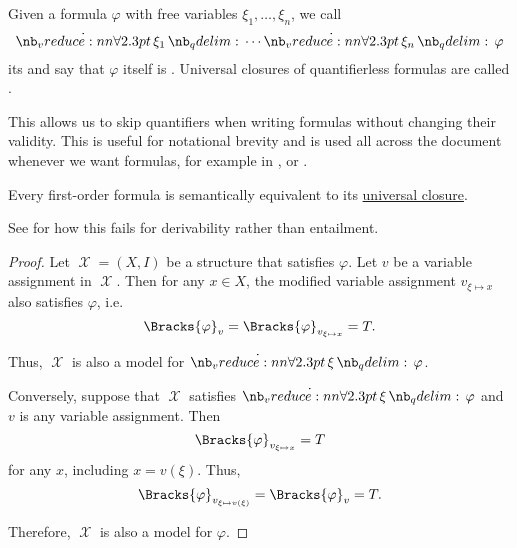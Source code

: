 \begin{definition}\label{def:universal_closure}
  Given a formula \( \varphi \) with free variables \( \xi_1, \ldots, \xi_n \), we call
  \begin{equation*}
    \qforall {\xi_1} \cdots \qforall {\xi_n} \varphi
  \end{equation*}
  its  and say that \( \varphi \) itself is . Universal closures of quantifierless formulas are called .
\end{definition}
\begin{comments}
  \item This allows us to skip quantifiers when writing formulas without changing their validity. This is useful for notational brevity and is used all across the document whenever we want  formulas, for example in ,  or .
\end{comments}

\begin{proposition}\label{thm:implicit_universal_quantification}
  Every first-order formula is semantically equivalent to its \hyperref[def:universal_closure]{universal closure}.
\end{proposition}
\begin{comments}
  \item See  for how this fails for derivability rather than entailment.
\end{comments}
\begin{proof}
  \SufficiencySubProof Let \( \mscrX = (X, I) \) be a structure that satisfies \( \varphi \). Let \( v \) be a variable assignment in \( \mscrX \). Then for any \( x \in X \), the modified variable assignment \( v_{\xi \mapsto x} \) also satisfies \( \varphi \), i.e.
  \begin{equation*}
    \Bracks{\varphi}_v = \Bracks{\varphi}_{v_{\xi \mapsto x}} = T.
  \end{equation*}

  Thus, \( \mscrX \) is also a model for \( \qforall \xi \varphi \).

  \NecessitySubProof Conversely, suppose that \( \mscrX \) satisfies \( \qforall \xi \varphi \) and \( v \) is any variable assignment. Then
  \begin{equation*}
    \Bracks{\varphi}_{v_{\xi \mapsto x}} = T
  \end{equation*}
  for any \( x \), including \( x = v(\xi) \). Thus,
  \begin{equation*}
    \Bracks{\varphi}_{v_{\xi \mapsto v(\xi)}} = \Bracks{\varphi}_v = T.
  \end{equation*}

  Therefore, \( \mscrX \) is also a model for \( \varphi \).
\end{proof}

